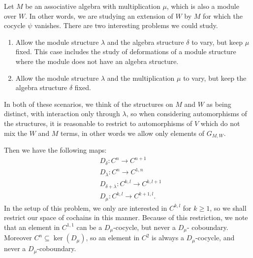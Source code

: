 \documentclass[12pt]{amsart}
\theoremstyle{definition}
\begin{document}
Let $M$ be an associative algebra with multiplication $\mu$, which
is also a module over $W$. In other words, we are studying an
extension of $W$ by $M$ for which the cocycle $\psi$ vanishes. There
are two interesting problems we could study.
\begin{enumerate}
\item Allow the module structure $\lambda$ and the algebra structure $\delta$ to vary,
but keep $\mu$ fixed. This case includes the study of deformations of a module structure
where the module does not have an algebra structure.
\item Allow the module structure $\lambda$ and the multiplication $\mu$ to vary,
but keep the algebra structure $\delta$ fixed.
\end{enumerate}
In both of these scenarios, we think of the structures on $M$ and
$W$ as being distinct, with interaction only through $\lambda$, so
when considering automorphisms of the structures, it is reasonable
to restrict to automorphisms of $V$ which do not mix the $W$ and $M$
terms, in other words we allow only elements of ${\mbox{$G_{M,W}$}}$.

Then we have the following maps:
\begin{align*}
&D_{\delta}:C^n{\rightarrow} C^{n+1}\\
&D_{\lambda}:C^n{\rightarrow} C^{1,n}\\
&D_{\delta+\lambda}:C^{k,l}{\rightarrow} C^{k,l+1}\\
&D_\mu:C^{k,l}{\rightarrow} C^{k+1,l}.
\end{align*}
In the setup of this problem, we only are interested in $C^{k,l}$ for $k\ge 1$, so
we shall restrict our space of cochains in this manner.  Because of this restriction,
we note that an element in $C^{1,1}$ can be a $D_\mu$-cocycle, but never a $D_{\mu}$-
coboundary. Moreover $C^n\subseteq\ker(D_\mu)$, so an element in $C^2$ is always a
$D_\mu$-cocycle, and never a $D_\mu$-coboundary.
\end{document}
